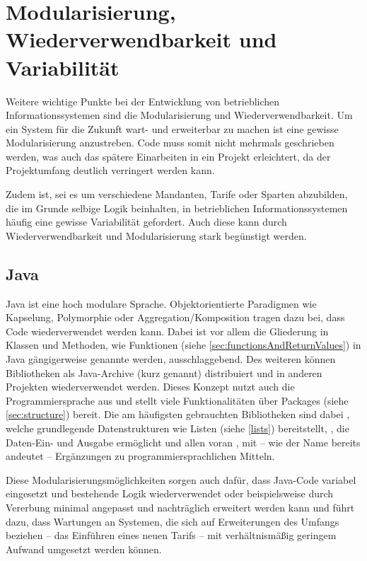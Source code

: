 \section{Modularisierung, Wiederverwendbarkeit und Variabilität}\label{wiederverwendbarkeit}

Weitere wichtige Punkte bei der Entwicklung von betrieblichen Informationssystemen sind die Modularisierung und Wiederverwendbarkeit. Um ein System für die Zukunft wart- und erweiterbar zu machen ist eine gewisse Modularisierung anzustreben. Code muss somit nicht mehrmals geschrieben werden, was auch das spätere Einarbeiten in ein Projekt erleichtert, da der Projektumfang deutlich verringert werden kann. 

Zudem ist, sei es um \zB verschiedene Mandanten, Tarife oder Sparten abzubilden, die im Grunde selbige Logik beinhalten, in betrieblichen Informationssystemen häufig eine gewisse Variabilität gefordert. Auch diese kann durch Wiederverwendbarkeit und Modularisierung stark begünstigt werden.

\subsection*{Java}
Java ist eine hoch modulare Sprache. Objektorientierte Paradigmen wie Kapselung, Polymorphie oder Aggregation/Komposition tragen dazu bei, dass Code wiederverwendet werden kann. Dabei ist vor allem die Gliederung in Klassen und Methoden, wie Funktionen (siehe \autoref{sec:functionsAndReturnValues}) in Java gängigerweise genannte werden, ausschlaggebend. Des weiteren können Bibliotheken als Java-Archive (kurz  genannt) dis­tri­bu­ie­rt und in anderen Projekten wiederverwendet werden. Dieses Konzept nutzt auch die Programmiersprache aus und stellt viele Funktionalitäten über Packages (siehe \autoref{sec:structure}) bereit. Die am häufigsten gebrauchten Bibliotheken sind dabei , welche grundlegende Datenstrukturen wie \zB Listen (siehe \autoref{lists}) bereitstellt, , die Daten-Ein- und Ausgabe ermöglicht und allen voran , mit -- wie der Name bereits andeutet -- Ergänzungen zu programmiersprachlichen Mitteln. 

Diese Modularisierungsmöglichkeiten sorgen auch dafür, dass Java-Code variabel eingesetzt und bestehende Logik wiederverwendet oder beispielsweise durch Vererbung minimal angepasst und nachträglich erweitert werden kann und führt dazu, dass Wartungen an Systemen, die sich auf Erweiterungen des Umfangs beziehen -- \zB das Einführen eines neuen Tarifs -- mit verhältnismäßig geringem Aufwand umgesetzt werden können.


